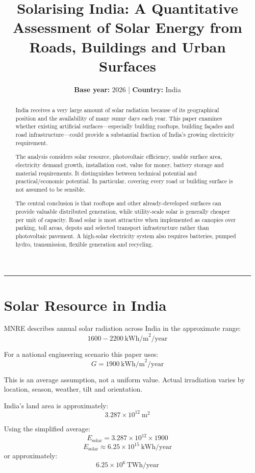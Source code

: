 \documentclass[11pt,a4paper]{article}
\title{\textbf{Solarising India: A Quantitative Assessment of Solar Energy from Roads, Buildings and Urban Surfaces}}
\author{\textbf{Base year:} 2026 \quad | \quad \textbf{Country:} India}
\date{}
\begin{document}
\maketitle

\begin{abstract}
India receives a very large amount of solar radiation because of its geographical position and the availability of many sunny days each year. This paper examines whether existing artificial surfaces---especially building rooftops, building façades and road infrastructure---could provide a substantial fraction of India's growing electricity requirement.

The analysis considers solar resource, photovoltaic efficiency, usable surface area, electricity demand growth, installation cost, value for money, battery storage and material requirements. It distinguishes between technical potential and practical/economic potential. In particular, covering every road or building surface is not assumed to be sensible.

The central conclusion is that rooftops and other already-developed surfaces can provide valuable distributed generation, while utility-scale solar is generally cheaper per unit of capacity. Road solar is most attractive when implemented as canopies over parking, toll areas, depots and selected transport infrastructure rather than photovoltaic pavement. A high-solar electricity system also requires batteries, pumped hydro, transmission, flexible generation and recycling.
\end{abstract}

\noindent\rule{\textwidth}{0.4pt}

\section{Solar Resource in India}

MNRE describes annual solar radiation across India in the approximate range:
\[
1600-2200\ \text{kWh/m}^2/\text{year}
\]

For a national engineering scenario this paper uses:
\[
G = 1900\ \text{kWh/m}^2/\text{year}
\]

This is an average assumption, not a uniform value. Actual irradiation varies by location, season, weather, tilt and orientation.

India's land area is approximately:
\[
3.287 \times 10^{12}\ \text{m}^2
\]

Using the simplified average:
\[
E_{\text{solar}} = 3.287 \times 10^{12} \times 1900
\]
\[
\boxed{E_{\text{solar}} \approx 6.25 \times 10^{15}\ \text{kWh/year}}
\]
or approximately:
\[
\boxed{6.25 \times 10^6\ \text{TWh/year}}
\]
\end{document}
